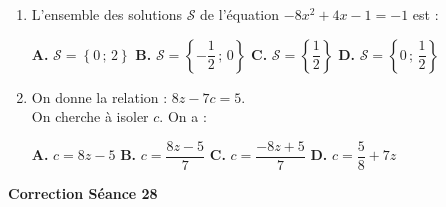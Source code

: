 \documentclass[a4paper,11pt]{article}
\begin{document}
\begin{seance}{}
\begin{enumerate}
\begin{center}
\textbf{\textcolor{Couleur1}{A.}} une réduction de $10\,\%$ \qquad \textbf{\textcolor{Couleur1}{B.}} une augmentation de $10\,\%$ \qquad \textbf{\textcolor{Couleur1}{C.}} une réduction de $13\,\%$ \qquad \textbf{\textcolor{Couleur1}{D.}} une réduction de $8\,\%$
\end{center}


\item L'ensemble des solutions $\mathscr{S}$ de l'équation  $-8x^2+4x-1=-1$ est :


\begin{center}
\textbf{\textcolor{Couleur1}{A.}} $\mathscr{S}=\left\{0\,;\,2\right\}$ \qquad \textbf{\textcolor{Couleur1}{B.}} $\mathscr{S}=\left\{-\dfrac{1}{2}\,;\,0\right\}$ \qquad \textbf{\textcolor{Couleur1}{C.}} $\mathscr{S}=\left\{\dfrac{1}{2}\right\}$ \qquad \textbf{\textcolor{Couleur1}{D.}} $\mathscr{S}=\left\{0\,;\,\dfrac{1}{2}\right\}$
\end{center}


\item On donne la relation  : $8z-7c=5$.\\
        
         On cherche à isoler $c$. On a :


\begin{center}
\textbf{\textcolor{Couleur1}{A.}} $c=8z-5$ \qquad \textbf{\textcolor{Couleur1}{B.}} $c=\dfrac{8z-5}{7}$ \qquad \textbf{\textcolor{Couleur1}{C.}} $c=\dfrac{-8z+5}{7}$ \qquad \textbf{\textcolor{Couleur1}{D.}} $c=\dfrac{5}{8}+7z$
\end{center}


\end{enumerate}

\end{seance}
\vspace{0.5cm}
\begin{center}

\textbf{\textcolor{Couleur8}{Correction Séance 28}}\\
\vspace{2mm}

\end{center}

\newpage
\end{document}

